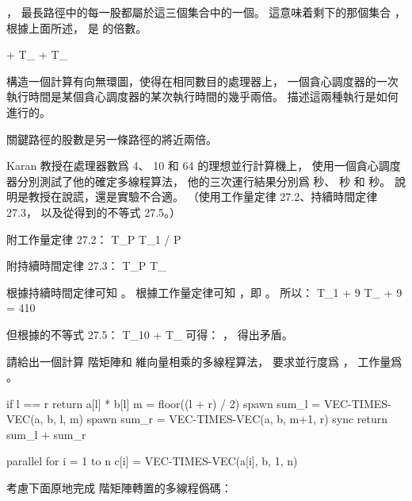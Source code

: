 ，
最長路徑中的每一股都屬於這三個集合中的一個。
這意味着剩下的那個集合 ，
根據上面所述，  是  的倍數。

\startformula
{} + T_{\infty}\le {} + T_{\infty}
\stopformula
\stopANSWER

\startEXERCISE
構造一個計算有向無環圖，使得在相同數目的處理器上，
一個貪心調度器的一次執行時間是某個貪心調度器的某次執行時間的幾乎兩倍。
描述這兩種執行是如何進行的。
\stopEXERCISE

\startANSWER
關鍵路徑的股數是另一條路徑的將近兩倍。
\stopANSWER

\startEXERCISE
Karan 教授在處理器數爲 4、 10 和 64 的理想並行計算機上，
使用一個貪心調度器分別測試了他的確定多線程算法，
他的三次運行結果分別爲  秒、  秒
和  秒。
說明是教授在說謊，還是實驗不合適。
（\hint 使用工作量定律 27.2、持續時間定律 27.3，
以及從\inexercise[27.1-3] 得到的不等式 27.5。）

附工作量定律 27.2：
\startformula
T_P \ge T_1 / P
\stopformula

附持續時間定律 27.3：
\startformula
T_P \ge T_{\infty}
\stopformula
\stopEXERCISE

\startANSWER
根據持續時間定律可知 。
根據工作量定律可知 ，即 。
所以：
\startformula
T_1 + 9 T_{\infty}  + 9  = 410
\stopformula

但根據\inexercise[27.1-3] 的不等式 27.5：
\startformula
T_{10} \le {} + T_{\infty}
\stopformula
可得： ，
得出矛盾。
\stopANSWER

\startEXERCISE[exercise:27.1-6]
請給出一個計算  階矩陣和  維向量相乘的多線程算法，
要求並行度爲 ，
工作量爲 。
\stopEXERCISE

\startANSWER
{}
\startCLRS
if l == r
	return a[l] * b[l]
m = floor((l + r) / 2)
spawn sum_l = VEC-TIMES-VEC(a, b, l, m)
spawn sum_r = VEC-TIMES-VEC(a, b, m+1, r)
sync
return sum_l + sum_r
\stopCLRS

\startCLRS
parallel for i = 1 to n
	c[i] = VEC-TIMES-VEC(a[i], b, 1, n)
\stopCLRS
\stopANSWER

\startEXERCISE[exercise:27.1-7]
考慮下面原地完成  階矩陣轉置的多線程僞碼：

